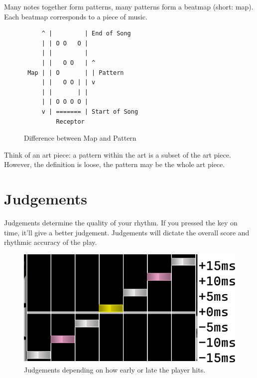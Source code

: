 Many notes together form patterns, many patterns form a beatmap (short: map).
Each beatmap corresponds to a piece of music.

\begin{figure}[H]
    \centering
    \begin{verbatim}
     ^ |         | End of Song
     | | O O   O |
     | |         |
     | |   O O   | ^
 Map | | O       | | Pattern
     | |   O O | | v 
     | |       | | 
     | | O O O O | 
     v | ======= | Start of Song
         Receptor
    \end{verbatim}
    \caption{Difference between Map and Pattern}
    \label{fig:pattern_map}
\end{figure}

Think of an art piece: a pattern within the art is a subset of the art piece.
However, the definition is loose, the pattern may be the whole art piece.


\section{Judgements}\label{sec:judgements}

Judgements determine the quality of your rhythm.
If you pressed the key on time, it'll give a better judgement.
Judgements will dictate the overall score and rhythmic accuracy of the play.

\begin{figure}[H]
    \centering
    \includegraphics[scale=0.25]{imgs/judgement}
    \caption{Judgements depending on how early or late the player hits.}
    \label{fig:judgement}
\end{figure}

